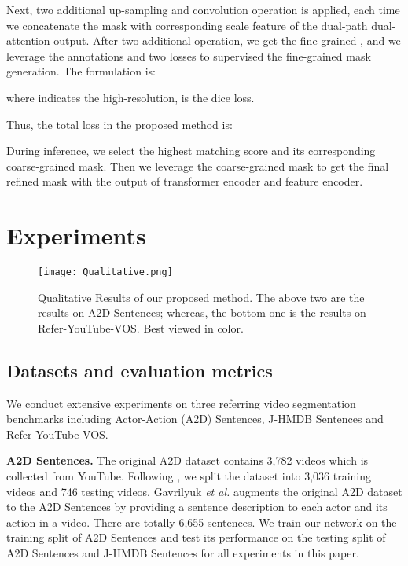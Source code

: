 \documentclass[sigconf]{acmart}
\begin{document}
Next, two additional up-sampling and convolution operation is applied, each time we concatenate the mask with corresponding scale feature of the dual-path dual-attention output. After two additional operation, we get the fine-grained , and we leverage the annotations and two losses to supervised the fine-grained mask generation. The formulation is:

where  indicates the high-resolution,  is the dice loss.

Thus, the total loss in the proposed method is:

During inference, we select the highest matching score and its corresponding coarse-grained mask. Then we leverage the coarse-grained mask to get the final refined mask with the output of transformer encoder and feature encoder. 













\section{Experiments}

\begin{figure*}[t]
\centering
\texttt{[image: Qualitative.png]}
\caption{Qualitative Results of our proposed method. The above two are the results on A2D Sentences; whereas, the bottom one is the results on Refer-YouTube-VOS. Best viewed in color.}
\label{fig4}
\end{figure*}



\subsection{Datasets and evaluation metrics}

We conduct extensive experiments on three referring video segmentation benchmarks including Actor-Action (A2D) Sentences, J-HMDB Sentences and Refer-YouTube-VOS.


{\textbf{A2D Sentences.}} The original A2D dataset contains 3,782 videos which is collected from YouTube. Following \cite{xu2015can}, we split the dataset into 3,036 training videos and 746 testing videos. Gavrilyuk \textit{et al.} \cite{gavrilyuk2018actor} augments the original A2D dataset to the A2D Sentences by providing a sentence description to each actor and its action in a video. There are totally 6,655 sentences. We train our network on the training split of A2D Sentences and test its performance on the testing split of A2D Sentences and J-HMDB Sentences for all experiments in this paper.
\end{document}
